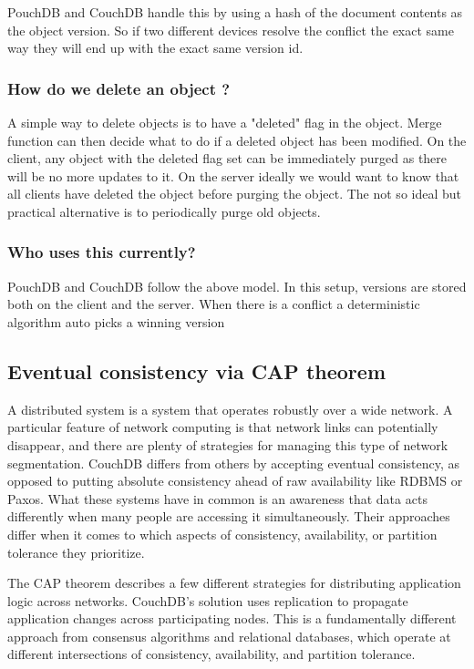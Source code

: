 PouchDB and CouchDB handle this by using a hash of the document contents as the object version. So if two 
different devices resolve the conflict the exact same way they will end up with the exact same version id.

\subsubsection{How do we delete an object ?}

A simple way to delete objects is to have a "deleted" flag in the object. Merge function can then decide what to do if a deleted object has been modified. On the client, any object with the deleted flag set can be immediately purged as there will be no more updates to it. On the server ideally we would want to know that all clients have deleted the object before purging the object. The not so ideal but practical alternative is to periodically purge old objects.

\subsubsection{Who uses this currently?}

PouchDB and CouchDB follow the above model. In this setup, versions are stored both on the client and 
the server. When there is a conflict a deterministic algorithm auto picks a winning version


\subsection{Eventual consistency via CAP theorem}

A distributed system is a system that operates robustly over a wide network. A particular feature of network computing is that network links can potentially disappear, and there are plenty of strategies for managing this type of network segmentation. CouchDB differs from others by accepting eventual consistency, as opposed to putting absolute consistency ahead of raw availability like RDBMS or Paxos. What these systems have in common is an awareness that data acts differently when many people are accessing it simultaneously. Their approaches differ when it comes to which aspects of consistency, availability, or partition tolerance they prioritize.

The CAP theorem describes a few different strategies for distributing application logic across networks. CouchDB’s solution uses replication to propagate application changes across participating nodes. This is a fundamentally different approach from consensus algorithms and relational databases, which operate at different intersections of consistency, availability, and partition tolerance.

